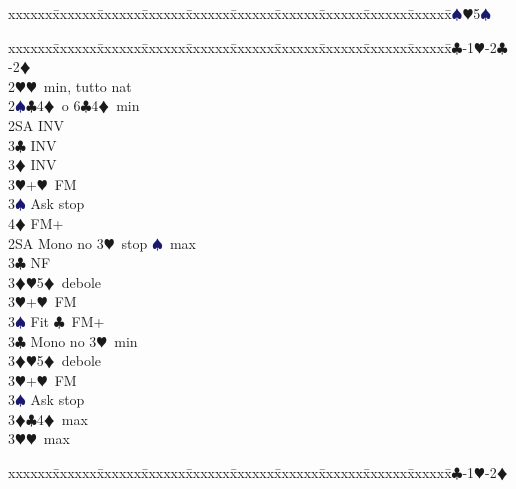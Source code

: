 \documentclass[a4paper,italian]{article}
\newcommand{\BC}{\textcolor{OliveGreen}{$\clubsuit$}}
\newcommand{\BD}{\textcolor{RedOrange}{$\vardiamondsuit$}}
\newcommand{\BH}{\textcolor{Red2}{$\varheartsuit${}}}
\newcommand{\BS}{\textcolor{MidnightBlue}{$\spadesuit${}}}
\newenvironment{bidtable}
{\begin{tabbing}

    xxxxxx\=xxxxxx\=xxxxxx\=xxxxxx\=xxxxxx\=xxxxxx\=xxxxxx\=xxxxxx\=xxxxxx\=xxxxxx\=\kill}
{\end{tabbing} }%
\begin{document}
\begin{multicols}{2}
\begin{bidtable}
                                        3\BS {}\BH 5\BS \-
                                    \end{bidtable}
                                    \bigbreak
                                    \begin{bidtable}
                                        1\BC-1\BH-2\BC-2\BD\+\\
                                        2\BH {}\BH\ min, tutto nat\\
                                        2\BS {}\BC 4\BD\ o 6\BC 4\BD\ min\+\\
                                        2SA \> INV\\
                                        3\BC \> INV\\
                                        3\BD \> INV\\
                                        3\BH {}+\BH\ FM\\
                                        3\BS \> Ask stop\\
                                        4\BD \> FM+\-\\
                                        2SA \> Mono no 3\BH\ stop \BS\ max\+\\
                                        3\BC \> NF\\
                                        3\BD {}\BH 5\BD\ debole\\
                                        3\BH {}+\BH\ FM\\
                                        3\BS \> Fit \BC\ FM+\-\\
                                        3\BC \> Mono no 3\BH\ min\+\\
                                        3\BD {}\BH 5\BD\ debole\\
                                        3\BH {}+\BH\ FM\\
                                        3\BS \> Ask stop\-\\
                                        3\BD {}\BC 4\BD\ max\\
                                        3\BH {}\BH\ max\-
                                    \end{bidtable}
                                    \bigbreak
                                    \begin{bidtable}
                                        1\BC-1\BH-2\BD\+\\

\end{bidtable}
\end{multicols}
\end{document}
